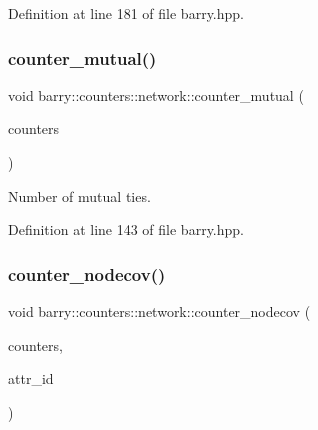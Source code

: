 Definition at line 181 of file barry.\+hpp.

\mbox{\label{namespacebarry_1_1counters_1_1network_afc4086d5788c8d5fa60ec529d9fa15dd}} 
\subsubsection{\texorpdfstring{counter\+\_\+mutual()}{counter\_mutual()}}
{\footnotesize\ttfamily void barry\+::counters\+::network\+::counter\+\_\+mutual (\begin{DoxyParamCaption}\item[{\hyperlink{namespacebarry_1_1counters_1_1network_a3b3c590303d47840d1967372ae495d95}{Net\+Counter\+Vector} $\ast$}]{counters }\end{DoxyParamCaption})\hspace{0.3cm}{\ttfamily [inline]}}



Number of mutual ties. 



Definition at line 143 of file barry.\+hpp.

\mbox{\label{namespacebarry_1_1counters_1_1network_a7087c6419195bc768c1e8c7730757d2e}} 
\subsubsection{\texorpdfstring{counter\+\_\+nodecov()}{counter\_nodecov()}}
{\footnotesize\ttfamily void barry\+::counters\+::network\+::counter\+\_\+nodecov (\begin{DoxyParamCaption}\item[{\hyperlink{namespacebarry_1_1counters_1_1network_a3b3c590303d47840d1967372ae495d95}{Net\+Counter\+Vector} $\ast$}]{counters,  }\item[{\hyperlink{namespacebarry_a11dfc53ddb4672278319aa04f1e09a6c}{uint}}]{attr\+\_\+id }\end{DoxyParamCaption})\hspace{0.3cm}{\ttfamily [inline]}}



